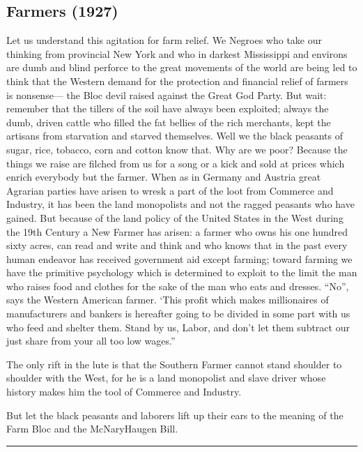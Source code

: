 \documentclass[letterpaper,10pt,english]{jupyterBook}
\begin{document}
\subsection{Farmers (1927)}
\label{\detokenize{Volumes/34/02/farmers:farmers-1927}}\label{\detokenize{Volumes/34/02/farmers::doc}}
\sphinxAtStartPar
Let us understand this agitation for farm relief. We Negroes who take our thinking from provincial New York and who in darkest Mississippi and environs are dumb and blind perforce to the great movements of the world are being led to think that the Western demand for the protection and financial relief of farmers is nonsense— the Bloc devil raised against the Great God Party. But wait: remember that the tillers of the soil have always been exploited; always the dumb, driven cattle who filled the fat bellies of the rich merchants, kept the artisans from starvation and starved themselves. Well we the black peasants of sugar, rice, tobacco, corn and cotton know that. Why are we poor? Because the things we raise are filched from us for a song or a kick and sold at prices which enrich everybody but the farmer. When as in Germany and Austria great Agrarian parties have arisen to wresk a part of the loot from Commerce and Industry, it has been the land monopolists and not the ragged peasants who have gained. But because of the land policy of the United States in the West during the 19th Century a New Farmer has arisen: a farmer who owns his one hundred sixty acres, can read and write and think and who knows that in the past every human endeavor has received government aid except farming; toward farming we have the primitive psychology which is determined to exploit to the limit the man who raises food and clothes for the sake of the man who eats and dresses. “No”, says the Western American farmer. ‘This profit which makes millionaires of manufacturers and bankers is hereafter going to be divided in some part with us who feed and shelter them. Stand by us, Labor, and don’t let them subtract our just share from your all too low wages.”

\sphinxAtStartPar
The only rift in the lute is that the Southern Farmer cannot stand shoulder to shoulder with the West, for he is a land monopolist and slave driver whose history makes him the tool of Commerce and Industry.

\sphinxAtStartPar
But let the black peasants and laborers lift up their ears to the meaning of the Farm Bloc and the McNary\sphinxhyphen{}Haugen Bill.


\bigskip\hrule\bigskip
\end{document}
